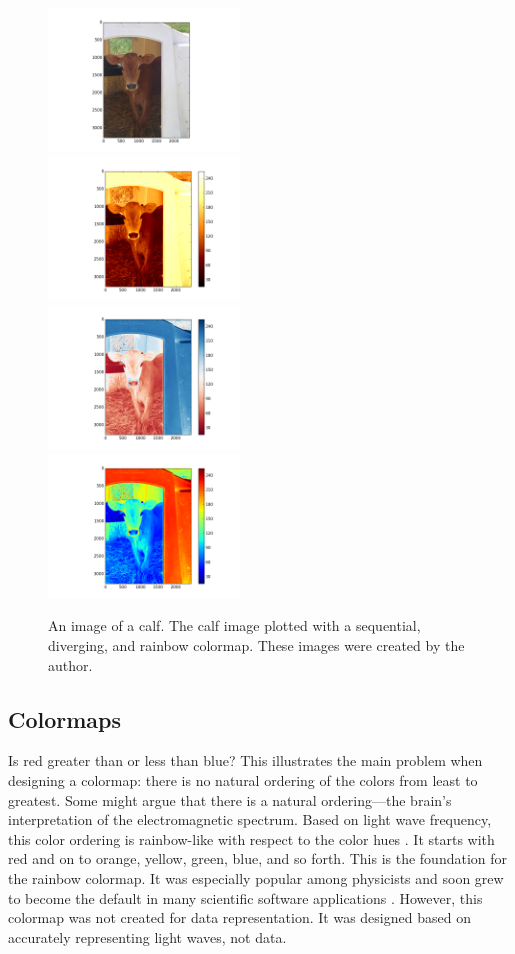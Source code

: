 \documentclass[journal,12pt]{IEEEtran}
\begin{document}
\begin{figure}
\centering
\includegraphics[width=2in]{calf_original} \\
\includegraphics[width=2in]{calf_sequential} \\
\includegraphics[width=2in]{calf_diverging} \\
\includegraphics[width=2in]{calf_rainbow} \\
\caption{An image of a calf. The calf image plotted with a
sequential, diverging, and rainbow colormap. These images were created by the author.}
\end{figure}

\subsection{Colormaps}

Is red greater than or less than blue? This illustrates the main problem when designing a colormap: there is no natural ordering of the colors
from least to greatest. Some might argue that there is a natural
ordering---the brain's interpretation of the electromagnetic spectrum.
Based on light wave frequency, this color ordering is rainbow-like with respect
to the color hues \cite{colormapping}. It starts with red and on to orange,
yellow, green, blue, and so forth. This is the foundation for the rainbow colormap.
It was especially popular among physicists and soon grew to become the default
in many scientific software applications \cite{rainbowstill,matlab}. However,
this colormap was not created for data representation. It was designed based
on accurately representing light waves, not data.
\end{document}
